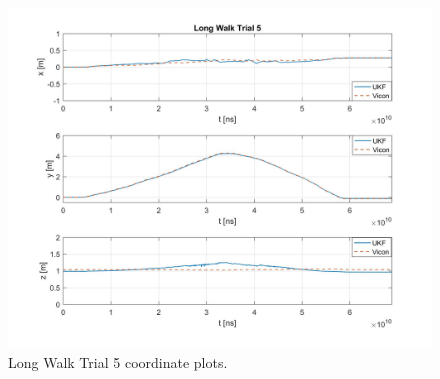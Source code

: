 \begin{figure}
  \centering
    \includegraphics[width=\textwidth]{longWalk5_xyz}
  \caption[Long Walk Trial 5]{Long Walk Trial 5 coordinate plots.}
  \label{fig:longWalk5_xyz}
\end{figure}
